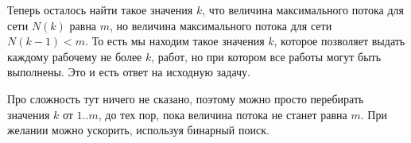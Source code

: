 \begin{enumerate}
	Теперь осталось найти такое значения $k$, что величина максимального потока для сети $N(k)$ равна $m$, но 
	величина максимального потока для сети $N(k - 1) < m$. То есть мы находим такое значения $k$, которое 
	позволяет выдать каждому рабочему не более $k$, работ, но при котором все работы могут быть выполнены. Это и 
	есть ответ на исходную задачу.
	
	Про сложность тут ничего не сказано, поэтому можно просто перебирать значения $k$ от $1..m$, до тех пор, 
	пока величина потока не станет равна $m$. При желании можно ускорить, используя бинарный поиск.
	
\end{enumerate}
